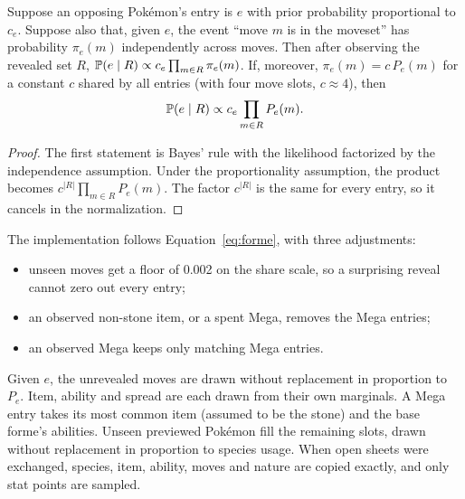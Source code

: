 \begin{lemma}
\label{lem:forme}
Suppose an opposing Pok\'{e}mon's entry is $e$ with prior probability
proportional to $c_e$. Suppose also that, given $e$, the event ``move $m$ is in
the moveset'' has probability $\pi_e(m)$ independently across moves. Then
after observing the revealed set $R$, $\mathbb{P}(e\mid R)\propto
c_e\prod_{m\in R}\pi_e(m)$. If, moreover, $\pi_e(m)=c\,P_e(m)$ for a constant
$c$ shared by all entries (with four move slots, $c\approx4$), then
\begin{equation}
  \mathbb{P}(e\mid R)\propto c_e\prod_{m\in R}P_e(m).
  \label{eq:forme}
\end{equation}
\end{lemma}
\begin{proof}
The first statement is Bayes' rule with the likelihood factorized by the
independence assumption. Under the proportionality assumption, the product
becomes $c^{|R|}\prod_{m\in R}P_e(m)$. The factor $c^{|R|}$ is the same for every
entry, so it cancels in the normalization.
\end{proof}

The implementation follows Equation~\eqref{eq:forme}, with three adjustments:
\begin{itemize}
  \item unseen moves get a floor of 0.002 on the share scale, so a surprising
    reveal cannot zero out every entry;
  \item an observed non-stone item, or a spent Mega, removes the Mega entries;
  \item an observed Mega keeps only matching Mega entries.
\end{itemize}
Given $e$, the unrevealed moves are drawn without replacement in proportion
to $P_e$. Item, ability and spread are each drawn from their own marginals. A
Mega entry takes its most common item (assumed to be the stone) and the base
forme's abilities. Unseen previewed Pok\'{e}mon fill the remaining slots,
drawn without replacement in proportion to species usage. When open sheets
were exchanged, species, item, ability, moves and nature are copied exactly,
and only stat points are sampled.


